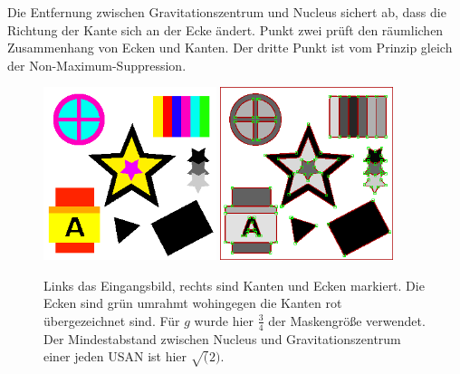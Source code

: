 \documentclass[a4paper, 11pt]{report}
\theoremstyle{definition}
\begin{document}
			Die Entfernung zwischen Gravitationszentrum und Nucleus sichert ab, dass die Richtung der Kante sich an der Ecke ändert. Punkt zwei prüft den räumlichen Zusammenhang von Ecken und Kanten. Der dritte Punkt ist vom Prinzip gleich der Non-Maximum-Suppression.

			\begin{figure}[H]\centering
				\includegraphics[width=0.45\textwidth]{../examples/original/original.png}\quad
				\includegraphics[width=0.45\textwidth]{../examples/original/test_overlay.png}
				\caption{Links das Eingangsbild, rechts sind Kanten und Ecken markiert. Die Ecken sind grün umrahmt wohingegen die Kanten rot übergezeichnet sind. Für $g$ wurde hier $\frac{3}{4}$ der Maskengröße verwendet. Der Mindestabstand zwischen Nucleus und Gravitationszentrum einer jeden USAN ist hier $\sqrt(2)$.}
				\label{fig:corner_test}
			\end{figure}
\end{document}
